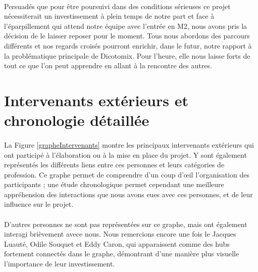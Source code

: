 \documentclass[11pt,a4paper]{article}
\theoremstyle{plain}
\theoremstyle{definition}
\begin{document}
\paragraph{} Persuadés que pour être poursuivi dans des conditions sérieuses ce projet nécessiterait un investissement à plein temps de notre part et face à l'éparpillement qui attend notre équipe avec l'entrée 
en M2, nous avons pris la décision de le laisser reposer pour le moment. Tous nous abordons des parcours différents et nos regards croisés pourront enrichir, dans le futur, notre rapport 
à la problématique principale de Dicotomix. Pour l'heure, elle nous laisse forts de tout ce que l'on peut apprendre en allant à la rencontre des autres.

\newpage
\appendix
\section{Intervenants extérieurs et chronologie détaillée}
\paragraph{} La Figure \ref{grapheIntervenants} montre les principaux intervenants extérieurs qui ont participé à l'élaboration ou à la mise en place du projet. Y sont également représentés les différents liens entre ces personnes et leurs catégories de profession. Ce graphe permet de comprendre d'un coup d'\oe il l'organisation des participants ; une étude chronologique permet cependant une meilleure appréhension des interactions que nous avons eues avec ces personnes, et de leur influence sur le projet.

\paragraph{} D'autres personnes ne sont pas représentées sur ce graphe, mais ont également interagi brièvement avece nous. Nous remercions encore une fois le Jacques Luauté, Odile Souquet et Eddy Caron, qui apparaissent comme des hubs fortement connectés dans le graphe, démontrant d'une manière plus visuelle l'importance de leur investissement. \\
\end{document}
